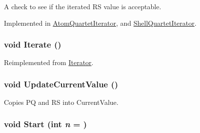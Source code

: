 A check to see if the iterated RS value is acceptable. 

Implemented in \hyperlink{classJKBuilder_1_1AtomQuartetIterator_a13e657ea529c0566a0bf48e9c5a488d7}{AtomQuartetIterator}, and \hyperlink{classJKBuilder_1_1ShellQuartetIterator_a13e657ea529c0566a0bf48e9c5a488d7}{ShellQuartetIterator}.\hypertarget{classJKBuilder_1_1QuartetIterator_a7874a07e98b52f4f147cde6f39353bae}{
\subsubsection[{Iterate}]{\setlength{\rightskip}{0pt plus 5cm}void Iterate ()}}
\label{classJKBuilder_1_1QuartetIterator_a7874a07e98b52f4f147cde6f39353bae}


Reimplemented from \hyperlink{classJKBuilder_1_1Iterator_a7874a07e98b52f4f147cde6f39353bae}{Iterator}.\hypertarget{classJKBuilder_1_1QuartetIterator_a1af5c865d6e9cfe63d0dedc53bdc13ba}{
\subsubsection[{UpdateCurrentValue}]{\setlength{\rightskip}{0pt plus 5cm}void UpdateCurrentValue ()}}
\label{classJKBuilder_1_1QuartetIterator_a1af5c865d6e9cfe63d0dedc53bdc13ba}


Copies PQ and RS into CurrentValue. \hypertarget{classJKBuilder_1_1QuartetIterator_a34ca36a99b20ae3170babadaffe51ed2}{
\subsubsection[{Start}]{\setlength{\rightskip}{0pt plus 5cm}void Start (int {\em n} = {})}}
\label{classJKBuilder_1_1QuartetIterator_a34ca36a99b20ae3170babadaffe51ed2}


